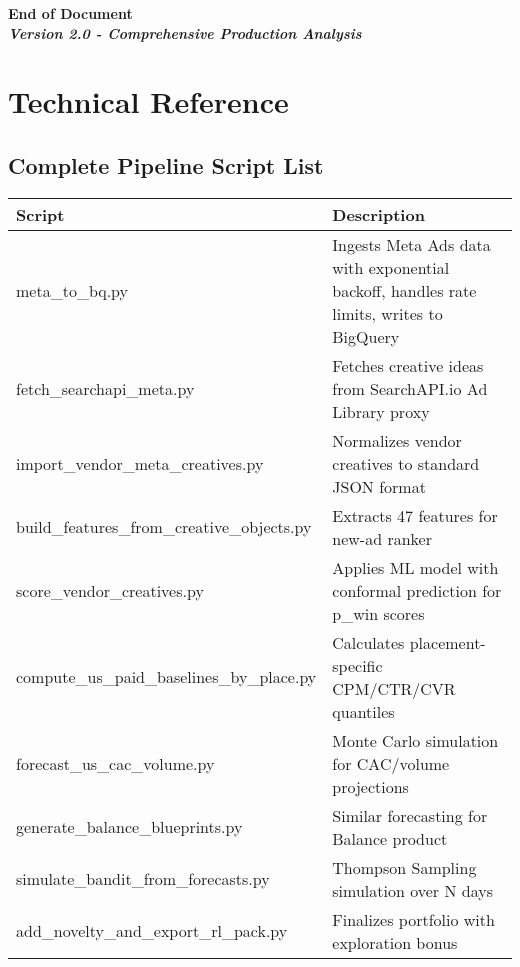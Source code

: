 \documentclass[11pt,a4paper]{report}
\begin{document}
\vspace{1cm}

\begin{center}
{\Large\bfseries\color{aelpdark}
End of Document\\[0.5cm]
\textit{Version 2.0 - Comprehensive Production Analysis}}
\end{center}

\appendix

\chapter{Technical Reference}

\section{Complete Pipeline Script List}

\begin{longtable}{|l|p{8cm}|}
\hline
\rowcolor{aelpblue!20}
\textbf{Script} & \textbf{Description} \\
\hline
\endhead

meta\_to\_bq.py & Ingests Meta Ads data with exponential backoff, handles rate limits, writes to BigQuery \\
\hline
fetch\_searchapi\_meta.py & Fetches creative ideas from SearchAPI.io Ad Library proxy \\
\hline
import\_vendor\_meta\_creatives.py & Normalizes vendor creatives to standard JSON format \\
\hline
build\_features\_from\_creative\_objects.py & Extracts 47 features for new-ad ranker \\
\hline
score\_vendor\_creatives.py & Applies ML model with conformal prediction for p\_win scores \\
\hline
compute\_us\_paid\_baselines\_by\_place.py & Calculates placement-specific CPM/CTR/CVR quantiles \\
\hline
forecast\_us\_cac\_volume.py & Monte Carlo simulation for CAC/volume projections \\
\hline
generate\_balance\_blueprints.py & Similar forecasting for Balance product \\
\hline
simulate\_bandit\_from\_forecasts.py & Thompson Sampling simulation over N days \\
\hline
add\_novelty\_and\_export\_rl\_pack.py & Finalizes portfolio with exploration bonus \\
\hline
\end{longtable}
\end{document}
